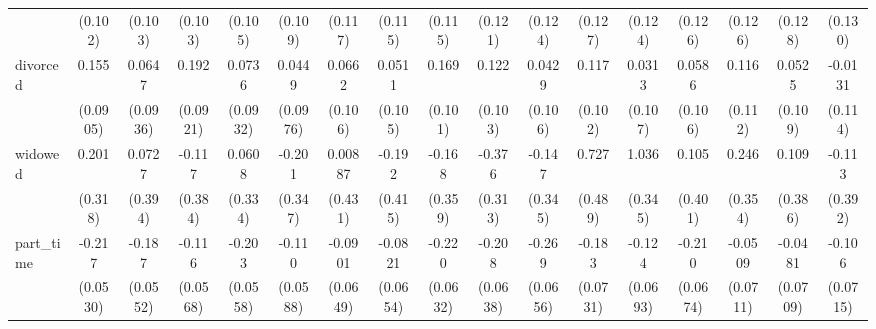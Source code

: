 {\begin{tabular}{l*{16}{c}}
                    &     (0.102)         &     (0.103)         &     (0.103)         &     (0.105)         &     (0.109)         &     (0.117)         &     (0.115)         &     (0.115)         &     (0.121)         &     (0.124)         &     (0.127)         &     (0.124)         &     (0.126)         &     (0.126)         &     (0.128)         &     (0.130)         \\
[1em]
divorced            &       0.155         &      0.0647         &       0.192\sym{*}  &      0.0736         &      0.0449         &      0.0662         &      0.0511         &       0.169         &       0.122         &      0.0429         &       0.117         &      0.0313         &      0.0586         &       0.116         &      0.0525         &     -0.0131         \\
                    &    (0.0905)         &    (0.0936)         &    (0.0921)         &    (0.0932)         &    (0.0976)         &     (0.106)         &     (0.105)         &     (0.101)         &     (0.103)         &     (0.106)         &     (0.102)         &     (0.107)         &     (0.106)         &     (0.112)         &     (0.109)         &     (0.114)         \\
[1em]
widowed             &       0.201         &      0.0727         &      -0.117         &      0.0608         &      -0.201         &     0.00887         &      -0.192         &      -0.168         &      -0.376         &      -0.147         &       0.727         &       1.036\sym{**} &       0.105         &       0.246         &       0.109         &      -0.113         \\
                    &     (0.318)         &     (0.394)         &     (0.384)         &     (0.334)         &     (0.347)         &     (0.431)         &     (0.415)         &     (0.359)         &     (0.313)         &     (0.345)         &     (0.489)         &     (0.345)         &     (0.401)         &     (0.354)         &     (0.386)         &     (0.392)         \\
[1em]
part\_time           &      -0.217\sym{***}&      -0.187\sym{***}&      -0.116\sym{*}  &      -0.203\sym{***}&      -0.110         &     -0.0901         &     -0.0821         &      -0.220\sym{***}&      -0.208\sym{**} &      -0.269\sym{***}&      -0.183\sym{*}  &      -0.124         &      -0.210\sym{**} &     -0.0509         &     -0.0481         &      -0.106         \\
                    &    (0.0530)         &    (0.0552)         &    (0.0568)         &    (0.0558)         &    (0.0588)         &    (0.0649)         &    (0.0654)         &    (0.0632)         &    (0.0638)         &    (0.0656)         &    (0.0731)         &    (0.0693)         &    (0.0674)         &    (0.0711)         &    (0.0709)         &    (0.0715)         \\

\end{tabular}}
